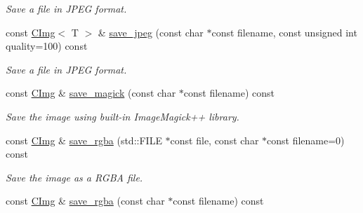 \begin{DoxyCompactItemize}
\begin{DoxyCompactList}\small\item\em Save a file in JPEG format. \item\end{DoxyCompactList}\item 
\hypertarget{structcimg__library_1_1_c_img_aed351b50d839db942c63e630525c476b}{
const \hyperlink{structcimg__library_1_1_c_img}{CImg}$<$ T $>$ \& \hyperlink{structcimg__library_1_1_c_img_aed351b50d839db942c63e630525c476b}{save\_\-jpeg} (const char $\ast$const filename, const unsigned int quality=100) const }
\label{structcimg__library_1_1_c_img_aed351b50d839db942c63e630525c476b}

\begin{DoxyCompactList}\small\item\em Save a file in JPEG format. \item\end{DoxyCompactList}\item 
\hypertarget{structcimg__library_1_1_c_img_a91529d80bd21a08ab9314fc132138f9c}{
const \hyperlink{structcimg__library_1_1_c_img}{CImg} \& \hyperlink{structcimg__library_1_1_c_img_a91529d80bd21a08ab9314fc132138f9c}{save\_\-magick} (const char $\ast$const filename) const }
\label{structcimg__library_1_1_c_img_a91529d80bd21a08ab9314fc132138f9c}

\begin{DoxyCompactList}\small\item\em Save the image using built-\/in ImageMagick++ library. \item\end{DoxyCompactList}\item 
\hypertarget{structcimg__library_1_1_c_img_a133af6a59ecc79219f1b2f68bee475bb}{
const \hyperlink{structcimg__library_1_1_c_img}{CImg} \& \hyperlink{structcimg__library_1_1_c_img_a133af6a59ecc79219f1b2f68bee475bb}{save\_\-rgba} (std::FILE $\ast$const file, const char $\ast$const filename=0) const }
\label{structcimg__library_1_1_c_img_a133af6a59ecc79219f1b2f68bee475bb}

\begin{DoxyCompactList}\small\item\em Save the image as a RGBA file. \item\end{DoxyCompactList}\item 
\hypertarget{structcimg__library_1_1_c_img_a2d8147748e3dab5dcd010fb2bf46d7ec}{
const \hyperlink{structcimg__library_1_1_c_img}{CImg} \& \hyperlink{structcimg__library_1_1_c_img_a2d8147748e3dab5dcd010fb2bf46d7ec}{save\_\-rgba} (const char $\ast$const filename) const }
\label{structcimg__library_1_1_c_img_a2d8147748e3dab5dcd010fb2bf46d7ec}


\end{DoxyCompactItemize}
